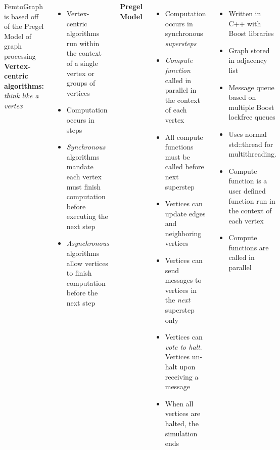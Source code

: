 \documentclass[25pt, portrait,  margin=0mm, innermargin=15mm,
  blockverticalspace=15mm, colspace=15mm, subcolspace=8mm]{tikzposter}
\begin{document}
\begin{columns}
     {
      FemtoGraph is based off of the Pregel Model of graph processing\\
      \textbf{Vertex-centric algorithms:} \textit{think like a vertex}
      \begin{itemize}
      \item Vertex-centric algorithms run within the context of a single vertex or groups of vertices
      \item Computation occurs in steps
      \item \textit{Synchronous} algorithms mandate each vertex must finish computation before executing the next step
      \item \textit{Asynchronous} algorithms allow vertices to finish computation before the next step
      \end{itemize}

      \textbf{Pregel Model}
      \begin{itemize}
      \item Computation occurs in synchronous \textit{supersteps}
      \item \textit{Compute function} called in parallel in the context of each vertex
      \item All compute functions must be called before next superstep
      \item Vertices can update edges and neighboring vertices
      \item Vertices can send messages to vertices in the \textit{next} superstep only
      \item Vertices can \textit{vote to halt}. Vertices un-halt upon receiving a message
      \item When all vertices are halted, the simulation ends
      \end{itemize}
      
      }

     {

      \begin{itemize}
      \item Written in C++ with Boost libraries
      \item Graph stored in adjacency list
      \item Message queue based on multiple Boost lockfree queues
      \item Uses normal std::thread for multithreading.
      \item Compute function is a user defined function run in the context of each vertex
      \item Compute functions are called in parallel
      \end{itemize}


}
\end{columns}
\end{document}
